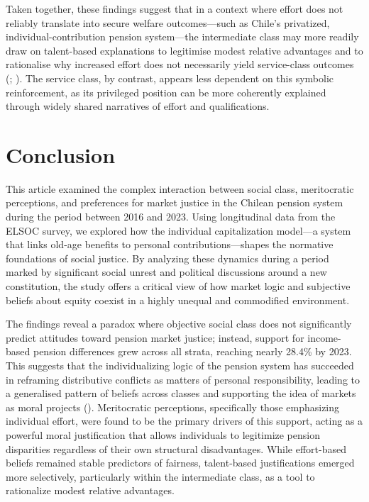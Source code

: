 \documentclass[
  12pt,
]{article}
\begin{document}
Taken together, these findings suggest that in a context where effort
does not reliably translate into secure welfare outcomes---such as
Chile's privatized, individual-contribution pension system---the
intermediate class may more readily draw on talent-based explanations to
legitimise modest relative advantages and to rationalise why increased
effort does not necessarily yield service-class outcomes
(;
). The service
class, by contrast, appears less dependent on this symbolic
reinforcement, as its privileged position can be more coherently
explained through widely shared narratives of effort and qualifications.

\section{Conclusion}\label{conclusion}

This article examined the complex interaction between social class,
meritocratic perceptions, and preferences for market justice in the
Chilean pension system during the period between 2016 and 2023. Using
longitudinal data from the ELSOC survey, we explored how the individual
capitalization model---a system that links old-age benefits to personal
contributions---shapes the normative foundations of social justice. By
analyzing these dynamics during a period marked by significant social
unrest and political discussions around a new constitution, the study
offers a critical view of how market logic and subjective beliefs about
equity coexist in a highly unequal and commodified environment.

The findings reveal a paradox where objective social class does not
significantly predict attitudes toward pension market justice; instead,
support for income-based pension differences grew across all strata,
reaching nearly 28.4\% by 2023. This suggests that the individualizing
logic of the pension system has succeeded in reframing distributive
conflicts as matters of personal responsibility, leading to a
generalised pattern of beliefs across classes and supporting the idea of
markets as moral projects (). Meritocratic perceptions, specifically those
emphasizing individual effort, were found to be the primary drivers of
this support, acting as a powerful moral justification that allows
individuals to legitimize pension disparities regardless of their own
structural disadvantages. While effort-based beliefs remained stable
predictors of fairness, talent-based justifications emerged more
selectively, particularly within the intermediate class, as a tool to
rationalize modest relative advantages.
\end{document}

